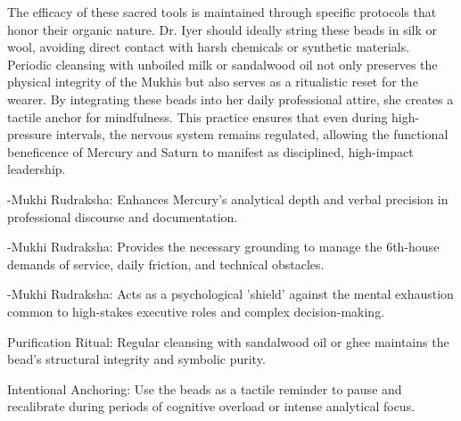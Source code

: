 {\fontsize{9}{13}\selectfont The efficacy of these sacred tools is maintained through specific protocols that honor their organic nature. Dr. Iyer should ideally string these beads in silk or wool, avoiding direct contact with harsh chemicals or synthetic materials. Periodic cleansing with unboiled milk or sandalwood oil not only preserves the physical integrity of the Mukhis but also serves as a ritualistic reset for the wearer. By integrating these beads into her daily professional attire, she creates a tactile anchor for mindfulness. This practice ensures that even during high-pressure intervals, the nervous system remains regulated, allowing the functional beneficence of Mercury and Saturn to manifest as disciplined, high-impact leadership.}\par\vspace{1.8mm}

\begin{diamondlist}
  \item {\fontsize{8.5}{12}-Mukhi Rudraksha: Enhances Mercury's analytical depth and verbal precision in professional discourse and documentation.}
  \item {\fontsize{8.5}{12}-Mukhi Rudraksha: Provides the necessary grounding to manage the 6th-house demands of service, daily friction, and technical obstacles.}
  \item {\fontsize{8.5}{12}-Mukhi Rudraksha: Acts as a psychological 'shield' against the mental exhaustion common to high-stakes executive roles and complex decision-making.}
  \item {\fontsize{8.5}{12}\selectfont Purification Ritual: Regular cleansing with sandalwood oil or ghee maintains the bead's structural integrity and symbolic purity.}
  \item {\fontsize{8.5}{12}\selectfont Intentional Anchoring: Use the beads as a tactile reminder to pause and recalibrate during periods of cognitive overload or intense analytical focus.}
\end{diamondlist}


\label{topic61}

